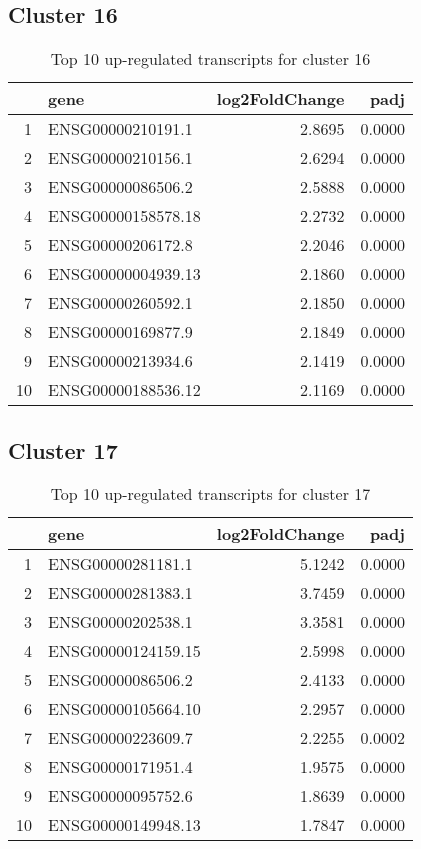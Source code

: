 \documentclass{article}
\begin{document}
\subsection{Cluster 16 }
\begin{table}[H]
\centering
\begin{tabular}{rlrr}
  \hline
 & gene & log2FoldChange & padj \\ 
  \hline
1 & ENSG00000210191.1 & 2.8695 & 0.0000 \\ 
  2 & ENSG00000210156.1 & 2.6294 & 0.0000 \\ 
  3 & ENSG00000086506.2 & 2.5888 & 0.0000 \\ 
  4 & ENSG00000158578.18 & 2.2732 & 0.0000 \\ 
  5 & ENSG00000206172.8 & 2.2046 & 0.0000 \\ 
  6 & ENSG00000004939.13 & 2.1860 & 0.0000 \\ 
  7 & ENSG00000260592.1 & 2.1850 & 0.0000 \\ 
  8 & ENSG00000169877.9 & 2.1849 & 0.0000 \\ 
  9 & ENSG00000213934.6 & 2.1419 & 0.0000 \\ 
  10 & ENSG00000188536.12 & 2.1169 & 0.0000 \\ 
   \hline
\end{tabular}
\caption{Top 10 up-regulated transcripts for cluster 16} 
\label{tab:q3_1_16}
\end{table}
\subsection{Cluster 17 }
\begin{table}[H]
\centering
\begin{tabular}{rlrr}
  \hline
 & gene & log2FoldChange & padj \\ 
  \hline
1 & ENSG00000281181.1 & 5.1242 & 0.0000 \\ 
  2 & ENSG00000281383.1 & 3.7459 & 0.0000 \\ 
  3 & ENSG00000202538.1 & 3.3581 & 0.0000 \\ 
  4 & ENSG00000124159.15 & 2.5998 & 0.0000 \\ 
  5 & ENSG00000086506.2 & 2.4133 & 0.0000 \\ 
  6 & ENSG00000105664.10 & 2.2957 & 0.0000 \\ 
  7 & ENSG00000223609.7 & 2.2255 & 0.0002 \\ 
  8 & ENSG00000171951.4 & 1.9575 & 0.0000 \\ 
  9 & ENSG00000095752.6 & 1.8639 & 0.0000 \\ 
  10 & ENSG00000149948.13 & 1.7847 & 0.0000 \\ 
   \hline
\end{tabular}
\caption{Top 10 up-regulated transcripts for cluster 17} 
\label{tab:q3_1_17}
\end{table}
\end{document}
